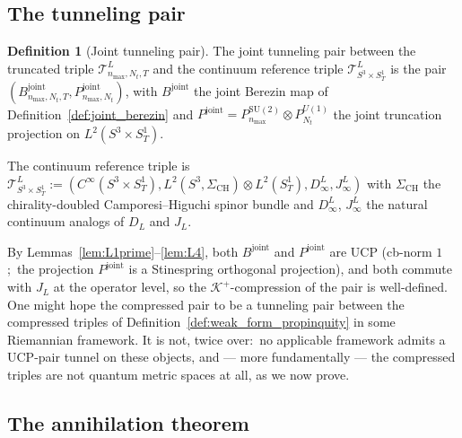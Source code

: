 \documentclass[11pt,a4paper]{article}
\theoremstyle{plain}
\theoremstyle{definition}
\newtheorem{definition}[theorem]{Definition}
\newcommand{\nmax}{n_{\max}}
\newcommand{\Nt}{N_{t}}
\newcommand{\sthree}{S^{3}}
\newcommand{\SoneT}{S^{1}_{T}}
\newcommand{\Manifold}{S^{3}\times S^{1}_{T}}
\newcommand{\Krein}{\mathcal{K}}
\newcommand{\Tcal}{\mathcal{T}}
\newcommand{\SU}{\mathrm{SU}}
\newcommand{\Uone}{U(1)}
\newcommand{\DL}{D_{L}}
\newcommand{\JL}{J_{L}}
\newcommand{\Bjoint}{B^{\mathrm{joint}}}
\newcommand{\Pjoint}{P^{\mathrm{joint}}}
\newcommand{\Kplus}{\Krein^{+}}
\begin{document}
\subsection{The tunneling pair}\label{sec:tunneling_pair}

\begin{definition}[Joint tunneling pair]\label{def:tunneling_pair}
The joint tunneling pair between the truncated triple
$\Tcal^{L}_{\nmax,\Nt,T}$ and the continuum reference triple
$\Tcal^{L}_{\Manifold}$ is the pair $(\Bjoint_{\nmax,\Nt,T},
\Pjoint_{\nmax,\Nt})$, with $\Bjoint$ the joint Berezin map of
Definition~\ref{def:joint_berezin} and $\Pjoint = P^{\SU(2)}_{\nmax}
\otimes P^{\Uone}_{\Nt}$ the joint truncation projection on
$L^{2}(\Manifold)$.

The continuum reference triple is $\Tcal^{L}_{\Manifold}
:= (C^{\infty}(\Manifold), L^{2}(\sthree, \Sigma_{\mathrm{CH}}) \otimes
L^{2}(\SoneT), D^{L}_{\infty}, J^{L}_{\infty})$ with $\Sigma_{\mathrm{CH}}$
the chirality-doubled Camporesi--Higuchi spinor bundle and
$D^{L}_{\infty}$, $J^{L}_{\infty}$ the natural continuum analogs of
$\DL$ and $\JL$.
\end{definition}

By Lemmas~\ref{lem:L1prime}--\ref{lem:L4}, both $\Bjoint$ and $\Pjoint$
are UCP (cb-norm $1$;\ the projection $\Pjoint$ is a Stinespring
orthogonal projection), and both commute with $\JL$ at the operator
level, so the $\Kplus$-compression of the pair is well-defined. One
might hope the compressed pair to be a tunneling pair between the
compressed triples of Definition~\ref{def:weak_form_propinquity} in
some Riemannian framework. It is not, twice over:\ no applicable
framework admits a UCP-pair tunnel on these objects, and — more
fundamentally — the compressed triples are not quantum metric spaces
at all, as we now prove.

\subsection{The annihilation theorem}\label{sec:annihilation}
\end{document}
